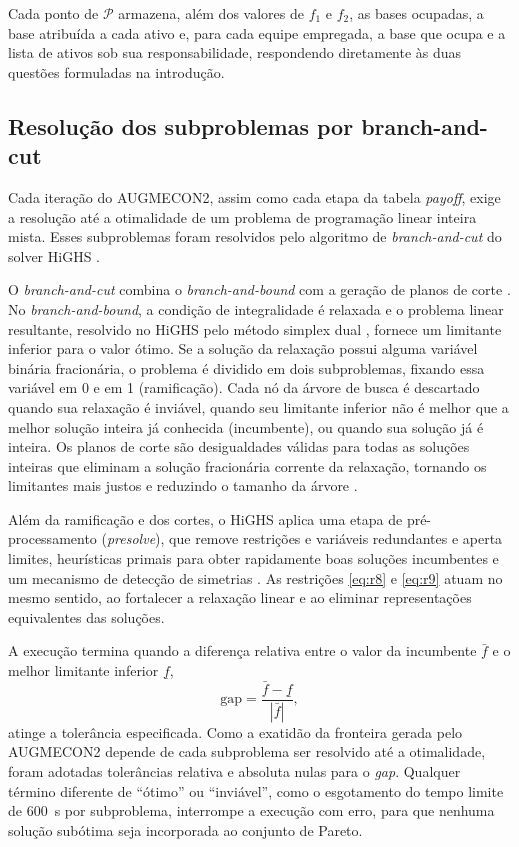 \documentclass[conference]{IEEEtran}
\begin{document}
Cada ponto de $\mathcal{P}$ armazena, além dos valores de $f_1$ e $f_2$, as bases ocupadas, a base atribuída a cada ativo e, para cada equipe empregada, a base que ocupa e a lista de ativos sob sua responsabilidade, respondendo diretamente às duas questões formuladas na introdução.

\subsection{Resolução dos subproblemas por branch-and-cut}
\label{sec:bc}

Cada iteração do AUGMECON2, assim como cada etapa da tabela \textit{payoff}, exige a resolução até a otimalidade de um problema de programação linear inteira mista. Esses subproblemas foram resolvidos pelo algoritmo de \textit{branch-and-cut} do solver HiGHS \cite{huangfu2018,highs}.

O \textit{branch-and-cut} combina o \textit{branch-and-bound} \cite{landdoig1960} com a geração de planos de corte \cite{padberg1991,wolsey1998}. No \textit{branch-and-bound}, a condição de integralidade é relaxada e o problema linear resultante, resolvido no HiGHS pelo método simplex dual \cite{huangfu2018}, fornece um limitante inferior para o valor ótimo. Se a solução da relaxação possui alguma variável binária fracionária, o problema é dividido em dois subproblemas, fixando essa variável em 0 e em 1 (ramificação). Cada nó da árvore de busca é descartado quando sua relaxação é inviável, quando seu limitante inferior não é melhor que a melhor solução inteira já conhecida (incumbente), ou quando sua solução já é inteira. Os planos de corte são desigualdades válidas para todas as soluções inteiras que eliminam a solução fracionária corrente da relaxação, tornando os limitantes mais justos e reduzindo o tamanho da árvore \cite{wolsey1998}.

Além da ramificação e dos cortes, o HiGHS aplica uma etapa de pré-processamento (\textit{presolve}), que remove restrições e variáveis redundantes e aperta limites, heurísticas primais para obter rapidamente boas soluções incumbentes e um mecanismo de detecção de simetrias \cite{highs}. As restrições \eqref{eq:r8} e \eqref{eq:r9} atuam no mesmo sentido, ao fortalecer a relaxação linear e ao eliminar representações equivalentes das soluções.

A execução termina quando a diferença relativa entre o valor da incumbente $\bar f$ e o melhor limitante inferior $\underline f$,
\begin{equation}
\text{gap} = \frac{\bar f - \underline f}{|\bar f|},
\end{equation}
atinge a tolerância especificada. Como a exatidão da fronteira gerada pelo AUGMECON2 depende de cada subproblema ser resolvido até a otimalidade, foram adotadas tolerâncias relativa e absoluta nulas para o \textit{gap}. Qualquer término diferente de ``ótimo'' ou ``inviável'', como o esgotamento do tempo limite de 600~s por subproblema, interrompe a execução com erro, para que nenhuma solução subótima seja incorporada ao conjunto de Pareto.
\end{document}
